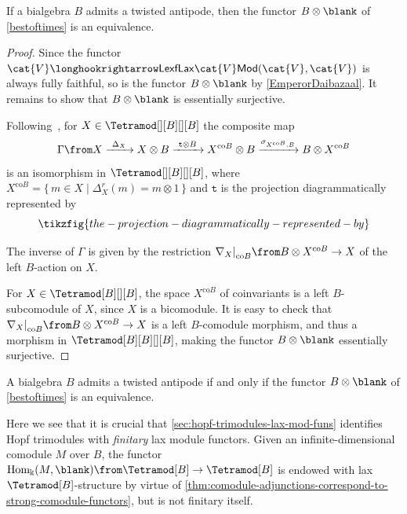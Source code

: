 \begin{proposition}
  If a bialgebra \(B\) admits a twisted antipode,
  then the functor \(B \otimes \blank\) of \cref{bestoftimes} is an equivalence.
\end{proposition}
\begin{proof}
  Since the functor \(\cat{V} \longhookrightarrow \mathsf{LexfLax}\cat{V}\mathsf{Mod}(\cat{V}, \cat{V})\) is always fully faithful,
  so is the functor \(B \otimes \blank\) by \cref{EmperorDaibazaal}.
  It remains to show that \(B \otimes \blank\) is essentially surjective.

  Following~\cite[Section~1.9.4]{montgomery93:hopf},
  for \(X \in \Tetramod[][B][][B]\)
  the composite map
  \[
    \Gamma\from X
    \xrightarrow{\ \Delta_{X}\ } X \otimes B
    \xrightarrow{\ \mathtt{t}\otimes B\ } X^{\mathrm{co}B} \otimes B
    \xrightarrow{\sigma_{X^{\mathrm{co}B},B}} B \otimes X^{\mathrm{co}B}
  \]
  is an isomorphism in \(\Tetramod[][B][][B]\),
  where \(X^{\mathrm{co}B} = \{\,m \in X \mid \Delta^{r}_{X}(m) = m \otimes 1\,\}\)
  and \(\mathtt{t}\) is the projection diagrammatically represented by
  \[
    \tikzfig{the-projection-diagrammatically-represented-by}
  \]

  The inverse of \(\Gamma\) is given by the restriction \({\nabla_{X}|}_{\mathrm{co}B}\from B \otimes X^{\mathrm{co}B} \to X\) of the left \(B\)\hyp{}action on \(X\).

  For \(X \in \Tetramod[B][][B]\),
  the space \(X^{\mathrm{co}B}\) of coinvariants is a left \(B\)\hyp{}subcomodule of \(X\),
  since \(X\) is a bicomodule.
  It is easy to check that \({\nabla_{X}|}_{\mathrm{co}B}\from B \otimes X^{\mathrm{co}B} \to X\) is a left \(B\)\hyp{}comodule morphism,
  and thus a morphism in \(\Tetramod[B][B][][B]\),
  making the functor \(B \otimes \blank\) essentially surjective.
\end{proof}

\begin{corollary}\label{cor:twisted-anti-iff-bestoftimes}
  A bialgebra \(B\) admits a twisted antipode if and only if the functor \(B \otimes \blank\) of \cref{bestoftimes} is an equivalence.
\end{corollary}

\begin{remark}
  Here we see that it is crucial
  that \cref{sec:hopf-trimodules-lax-mod-funs} identifies Hopf trimodules with \emph{finitary} lax module functors.
  Given an infinite\hyp{}dimensional comodule \(M\) over \(B\),
  the functor \(\mathrm{Hom}_{\Bbbk}(M, \blank)\from \Tetramod[B] \to \Tetramod[B]\)
  is endowed with lax \(\Tetramod[B]\)\hyp{}structure
  by virtue of \cref{thm:comodule-adjunctions-correspond-to-strong-comodule-functors},
  but is not finitary itself.
\end{remark}

